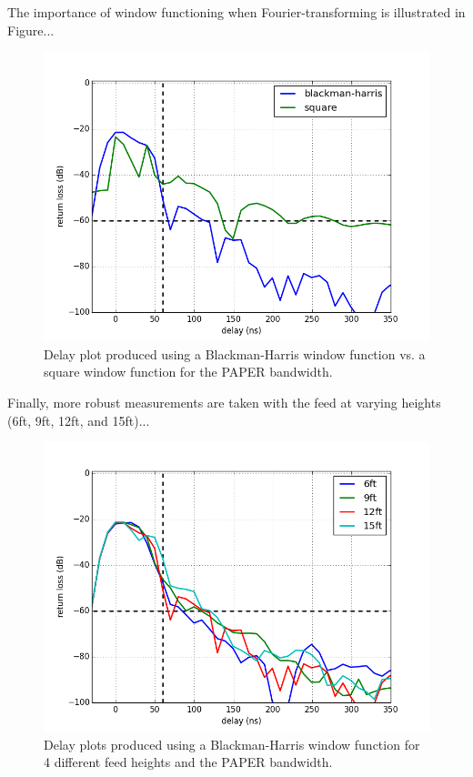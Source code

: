 \documentclass[12pt,preprint]{aastex}
\begin{document}
The importance of window functioning when Fourier-transforming is illustrated in Figure...

\begin{figure}
\centering
\includegraphics[totalheight=0.5\textheight]{plots/bh_vs_sq.png}
\caption{Delay plot produced using a Blackman-Harris window function vs. a square window function for the PAPER bandwidth.}
\end{figure}

Finally, more robust measurements are taken with the feed at varying heights (6ft, 9ft, 12ft, and 15ft)...

\begin{figure}
\centering
\includegraphics[totalheight=0.5\textheight]{plots/delay_heights_paper.png}
\caption{Delay plots produced using a Blackman-Harris window function for 4 different feed heights and the PAPER bandwidth.}
\end{figure}
\end{document}
